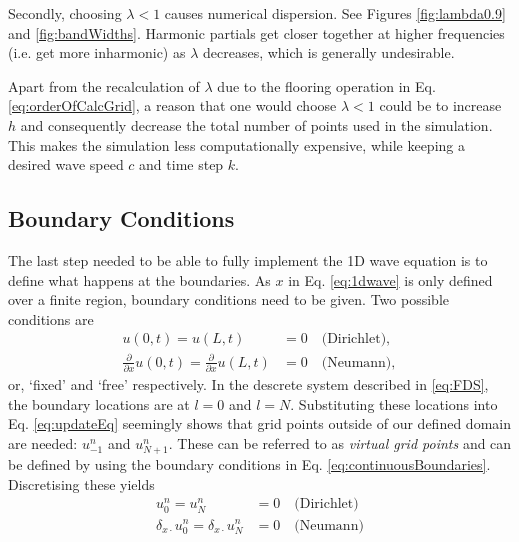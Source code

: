\documentclass[dvipsnames, preprint]{JASA}
\begin{document}
Secondly, choosing $\lambda < 1$ causes numerical dispersion. See Figures \ref{fig:lambda0.9} and \ref{fig:bandWidths}. Harmonic partials get closer together at higher frequencies (i.e. get more inharmonic) as $\lambda$ decreases, which is generally undesirable.

Apart from the recalculation of $\lambda$ due to the flooring operation in Eq. \eqref{eq:orderOfCalcGrid}, a reason that one would choose $\lambda < 1$ could be to increase $h$ and consequently decrease the total number of points used in the simulation. This makes the simulation less computationally expensive, while keeping a desired wave speed $c$ and time step $k$. 

\subsection{Boundary Conditions}
The last step needed to be able to fully implement the 1D wave equation is to define what happens at the boundaries. As $x$ in Eq. \eqref{eq:1dwave} is only defined over a finite region, boundary conditions need to be given. Two possible conditions are
\begin{subequations}\label{eq:continuousBoundaries}
    \begin{align}
        u(0, t) = u(L, t) &= 0\quad \text{(Dirichlet)},\label{eq:contDirichlet}\\
        \frac{\partial}{\partial x} u(0, t) = \frac{\partial}{\partial x} u(L, t) &= 0\quad \text{(Neumann)},\label{eq:contNeumann}
    \end{align}
\end{subequations}
or, `fixed' and `free' respectively. In the descrete system described in \eqref{eq:FDS}, the boundary locations are at $l = 0$ and $l = N$. Substituting these locations into Eq. \eqref{eq:updateEq} seemingly shows that grid points outside of our defined domain are needed: $u_{-1}^n$ and $u_{N+1}^n$. These can be referred to as \textit{virtual grid points} and can be defined by using the boundary conditions in Eq. \eqref{eq:continuousBoundaries}. Discretising these yields
\begin{subequations}
    \begin{align}
        u_0^n = u_N^n &= 0 \quad\text{(Dirichlet)}\label{eq:discreteDirichlet}\\
        \delta_{x\cdot} u_0^n = \delta_{x\cdot} u_N^n &= 0 \quad \text{(Neumann)}\label{eq:discreteNeumann}
    \end{align}
\end{subequations}
\end{document}
